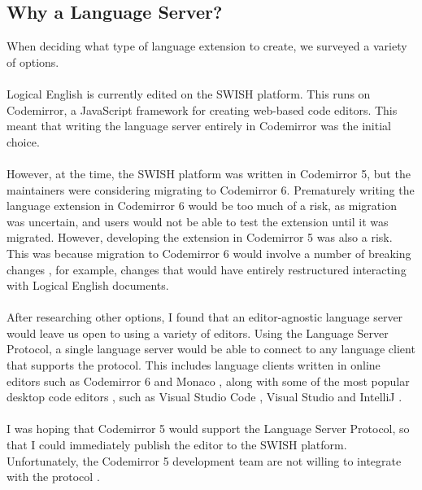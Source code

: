 \documentclass[../main.tex]{subfiles}
\begin{document}
\subsection{Why a Language Server?}
When deciding what type of language extension to create, we surveyed a variety of options. 
\\
\\
Logical English is currently edited on the SWISH platform. This runs on Codemirror, a JavaScript framework for creating web-based code editors. This meant that writing the language server entirely in Codemirror was the initial choice.
\\
\\
However, at the time, the SWISH platform was written in Codemirror 5, but the maintainers were considering migrating to Codemirror 6. Prematurely writing the language extension in Codemirror 6 would be too much of a risk, as migration was uncertain, and users would not be able to test the extension until it was migrated. However, developing the extension in Codemirror 5 was also a risk. This was because migration to Codemirror 6 would involve a number of breaking changes \cite{codemirror_migration}, for example, changes that would have entirely restructured interacting with Logical English documents.
\\ 
\\ 
After researching other options, I found that an editor-agnostic language server would leave us open to using a variety of editors. Using the Language Server Protocol, a single language server would be able to connect to any language client that supports the protocol. This includes language clients written in online editors such as Codemirror 6 \cite{codemirror_6_language_server} and Monaco \cite{monaco_language_server}, along with some of the most popular desktop code editors \cite{ide_rankings}, such as Visual Studio Code \cite{vsc_langserver_docs}, Visual Studio \cite{visual_studio_language_server} and IntelliJ \cite{intellij_language_server}. 
\\
\\
I was hoping that Codemirror 5 would support the Language Server Protocol, so that I could immediately publish the editor to the SWISH platform. Unfortunately, the Codemirror 5 development team are not willing to integrate with the protocol \cite{codemirror5_no_lsp}. 
\end{document}
